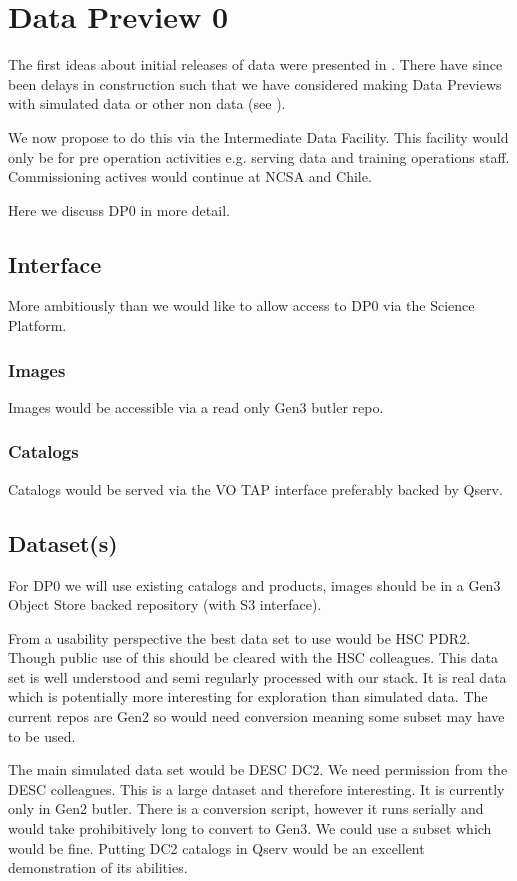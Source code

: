 \section{Data Preview 0}\label{sec:dp0}
The first ideas about initial releases of \RO data were presented in .
There have since been delays in construction such that we have considered making Data Previews with
simulated data or other non \RO data (see ).

We now propose to do this via the Intermediate Data Facility. This facility would only be for
pre operation activities e.g. serving data and training operations staff.
Commissioning actives would continue at NCSA and Chile.

Here we discuss DP0 in more detail.

\subsection {Interface}
More ambitiously than   we would like to allow access to DP0 via
the Science Platform.
\subsubsection{Images}
Images would be accessible via a read only Gen3 butler repo.
\subsubsection{Catalogs}
Catalogs would be served via the VO TAP interface preferably backed by Qserv.



\subsection {Dataset(s)} \label{sec:dataset}

For DP0 we will use existing catalogs and products, images should be in a Gen3 Object Store backed repository (with S3 interface).

From a usability perspective the best data set to use would be HSC PDR2. Though public use of
this should be cleared with the HSC colleagues. This data set is well understood and semi regularly processed with our stack.  It is real data which is potentially more interesting for exploration than simulated data. The current repos are Gen2 so would need conversion meaning some subset may have to be used.

The main simulated data set would be DESC DC2. We need permission from the DESC colleagues. This is a large dataset and therefore interesting. It is currently only in Gen2 butler. There is a conversion script, however it
runs serially and would take prohibitively long to convert to Gen3. We could use a subset which would be fine.  Putting DC2 catalogs in Qserv would be an excellent demonstration of its abilities.


